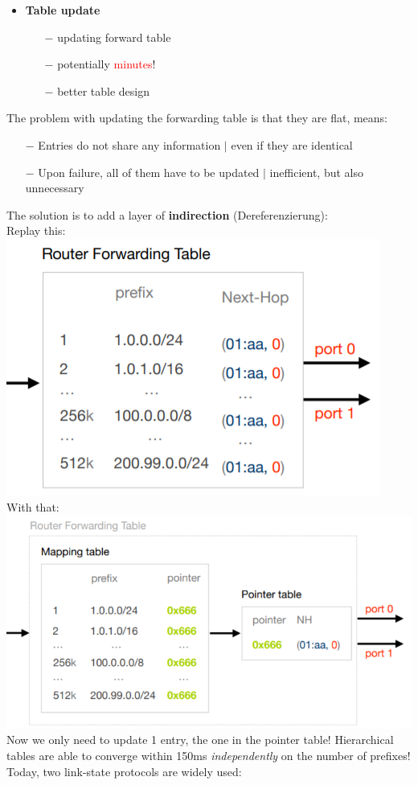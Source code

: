 \documentclass[a4paper, fontsize=8pt, landscape, DIV=1]{scrartcl}
\begin{document}
\begin{multicols*}{4}
\begin{itemize}[noitemsep]
\begin{itemize}
			\end{itemize}
			\item \textbf{Table update}
			\begin{itemize}
				\item[$-$] updating forward table
				\item[$-$] potentially \textcolor{Red}{minutes}!
				\item[$-$] better table design
			\end{itemize}
		\end{itemize} 
		The problem with updating the forwarding table is that they are flat,
		means:
		\vspace{-0.2cm}
		\begin{itemize}[noitemsep]
			\item[$-$] Entries do not share any information $\vert$ even if they are
			identical
			\item[$-$] Upon failure, all of them have to be updated $\vert$
			inefficient, but also unnecessary 
		\end{itemize} 
		The solution is to add a layer of \textbf{indirection}
		(Dereferenzierung):\\
		Replay this:\\
		
		\includegraphics[width=0.7\columnwidth]{images/Network_Layer/forward_table.png}\\
		With that:\\
		
		\includegraphics[width=\columnwidth]{images/Network_Layer/forward_table_pointer.png}
		Now we only need to update 1 entry, the one in the pointer table!
		Hierarchical tables are able to converge within 150ms \textit{independently} on
		the number of prefixes!\\
		Today, two link-state protocols are widely used:
		\vspace{1cm}
		

\end{multicols*}
\end{document}

